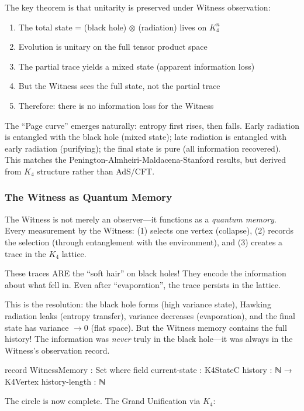 \documentclass[11pt,a4paper]{book}
\begin{document}
The key theorem is that unitarity is preserved under Witness observation:
\begin{enumerate}
\item The total state = (black hole) $\otimes$ (radiation) lives on $K_4^n$
\item Evolution is unitary on the full tensor product space
\item The partial trace yields a mixed state (apparent information loss)
\item But the Witness sees the full state, not the partial trace
\item Therefore: there is no information loss for the Witness
\end{enumerate}

The ``Page curve'' emerges naturally: entropy first rises, then falls. Early radiation is entangled with the black hole (mixed state); late radiation is entangled with early radiation (purifying); the final state is pure (all information recovered). This matches the Penington-Almheiri-Maldacena-Stanford results, but derived from $K_4$ structure rather than AdS/CFT.

\subsubsection{The Witness as Quantum Memory}

The Witness is not merely an observer---it functions as a \emph{quantum memory}. Every measurement by the Witness: (1) selects one vertex (collapse), (2) records the selection (through entanglement with the environment), and (3) creates a trace in the $K_4$ lattice.

These traces ARE the ``soft hair'' on black holes! They encode the information about what fell in. Even after ``evaporation'', the trace persists in the lattice.

This is the resolution: the black hole forms (high variance state), Hawking radiation leaks (entropy transfer), variance decreases (evaporation), and the final state has variance $\to 0$ (flat space). But the Witness memory contains the full history! The information was \emph{never} truly in the black hole---it was always in the Witness's observation record.

\begin{code}
record WitnessMemory : Set where
  field
    current-state : K4StateC
    history : ℕ → K4Vertex
    history-length : ℕ
\end{code}

The circle is now complete. The Grand Unification via $K_4$:
\end{document}
